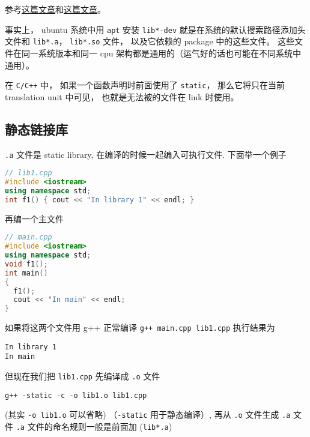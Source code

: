 
\begin{issues}
\issueDraft
\end{issues}


参考\href{https://blog.feabhas.com/2014/04/static-and-dynamic-libraries-on-linux/}{这篇文章}和\href{https://gcc.gnu.org/onlinedocs/gcc/Link-Options.html}{这篇文章}。

事实上， ubuntu 系统中用 \verb`apt` 安装 \verb`lib*-dev` 就是在系统的默认搜索路径添加头文件和 \verb`lib*.a`， \verb`lib*.so` 文件， 以及它依赖的 package 中的这些文件。 这些文件在同一系统版本和同一 cpu 架构都是通用的（运气好的话也可能在不同系统中通用）。

在 \verb`C/C++` 中， 如果一个函数声明时前面使用了 \verb`static`， 那么它将只在当前 translation unit 中可见， 也就是无法被的文件在 link 时使用。

\subsection{静态链接库}

\verb`.a` 文件是 static library, 在编译的时候一起编入可执行文件. 下面举一个例子

\begin{lstlisting}[language=cpp]
// lib1.cpp
#include <iostream>
using namespace std;
int f1() { cout << "In library 1" << endl; }
\end{lstlisting}

再编一个主文件

\begin{lstlisting}[language=cpp]
// main.cpp
#include <iostream>
using namespace std;
void f1();
int main()
{
  f1();
  cout << "In main" << endl;
}
\end{lstlisting}

如果将这两个文件用 g++ 正常编译 \verb`g++ main.cpp lib1.cpp` 执行结果为
\begin{lstlisting}[language=none]
In library 1
In main
\end{lstlisting}
但现在我们把 \verb`lib1.cpp` 先编译成 \verb`.o` 文件

\begin{lstlisting}[language=none]
g++ -static -c -o lib1.o lib1.cpp
\end{lstlisting}

(其实 \verb`-o lib1.o` 可以省略) （\verb`-static` 用于静态编译）, 再从 \verb`.o` 文件生成 \verb`.a` 文件 \verb`.a` 文件的命名规则一般是前面加 (\verb`lib*.a`)

